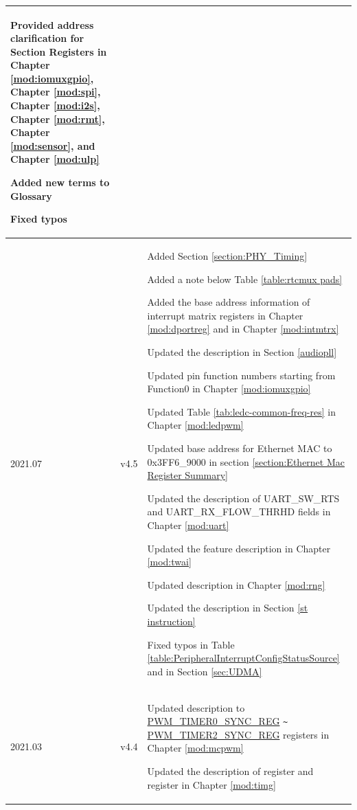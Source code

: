\begin{longtable}[l]{ | m{2cm} | m{1.5cm} | m{12cm} | }
    Provided address clarification for Section Registers in Chapter \ref{mod:iomuxgpio}, Chapter \ref{mod:spi}, Chapter \ref{mod:i2s}, Chapter \ref{mod:rmt}, Chapter \ref{mod:sensor}, and Chapter \ref{mod:ulp} %

    Added new terms to Glossary %

    Fixed typos %
    \\\hline
2021.07 & v4.5 &

Added Section \ref{section:PHY_Timing} %

Added a note below Table \ref{table:rtcmux pads} %

Added the base address information of interrupt matrix registers in Chapter \ref{mod:dportreg} \textit{\nameref{mod:dportreg}} and in Chapter \ref{mod:intmtrx} \textit{\nameref{mod:intmtrx}} %

Updated the description in Section \ref{audiopll} %

Updated pin function numbers starting from Function0 in Chapter \ref{mod:iomuxgpio} \textit{\nameref{mod:iomuxgpio}} %



Updated Table \ref{tab:ledc-common-freq-res} in Chapter \ref{mod:ledpwm} \textit{\nameref{mod:ledpwm}} %

Updated base address for Ethernet MAC to 0x3FF6\_9000 in section \ref{section:Ethernet Mac Register Summary} %

Updated the description of UART\_SW\_RTS and UART\_RX\_FLOW\_THRHD fields in Chapter \ref{mod:uart} \textit{\nameref{mod:uart}} %

Updated the feature description in Chapter \ref{mod:twai} \textit{\nameref{mod:twai}} %

Updated description in Chapter \ref{mod:rng} \textit{\nameref{mod:rng}} %

Updated the description in Section \ref{st instruction} %

Fixed typos in Table \ref{table:PeripheralInterruptConfigStatusSource} and in Section \ref{sec:UDMA} %
\\\hline
2021.03& v4.4 &
Updated description to \hyperref[regdesc:PWMTIMER0SYNCREG]{PWM\_TIMER0\_SYNC\_REG} \verb+~+ \hyperref[regdesc:PWMTIMER2SYNCREG]{PWM\_TIMER2\_SYNC\_REG} registers in Chapter \ref{mod:mcpwm} \textit{\nameref{mod:mcpwm}}

Updated the description of register \nameref{regdesc:TIMGRTCCALICFGREG} and register \nameref{regdesc:TIMGRTCCALICFG1REG} in Chapter \ref{mod:timg} \textit{\nameref{mod:timg}}


\end{longtable}
